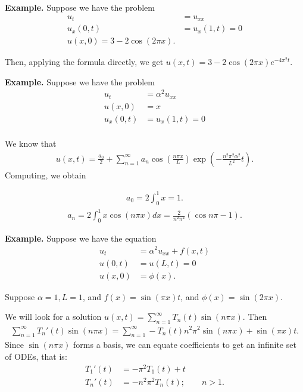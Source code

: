 \documentclass{article}
\begin{document}
{\bf Example.} Suppose we have the problem
\begin{align*}
  u_t &= u_{xx} \\
  u_x(0, t) &= u_x(1, t) = 0 \\
  u(x, 0) = 3 - 2 \cos (2 \pi x).
\end{align*}

Then, applying the formula directly, we get $u(x, t) = 3 - 2 \cos \left( 2 \pi x \right) e^{- 4 \pi^2 t}$.

{\bf Example.} Suppose we have the problem
\begin{align*}
  u_t &= \alpha^2 u_{xx} \\
  u(x, 0) &= x \\
  u_x(0, t) &= u_x(1, t) = 0 \\
\end{align*}

We know that
\begin{align*}
  u(x, t) = \frac{a_0}{2} + \sum_{n=1}^{\infty} a_n \cos \left( \frac{n \pi x}{L} \right) \exp \left( - \frac{n^2 \pi^2 \alpha^2}{L^2} t \right).
\end{align*}
Computing, we obtain

\begin{align*}
  a_0 = 2 \int_{0}^{1} x = 1.
\end{align*}
\begin{align*}
  a_n = 2 \int_{0}^{1} x \cos ( n \pi x) dx = \frac{2}{n^2 \pi^2} \left( \cos n \pi - 1 \right).
\end{align*}

{\bf Example.} Suppose we have the equation 
\begin{align*}
  u_t &= \alpha^2 u_{xx} + f(x, t) \\
  u(0, t) &= u(L, t) = 0 \\
  u(x, 0) &= \phi(x).
\end{align*}


Suppose $\alpha = 1, L = 1$, and $f(x) = \sin (\pi x) t$, and $\phi(x) = \sin(2 \pi x)$.

We will look for a solution $u(x, t) = \sum_{n=1}^{\infty} T_n(t) \sin (n \pi x)$.  Then
\begin{align*}
  \sum_{n=1}^{\infty} T_n'(t) \sin (n \pi x) = \sum_{n=1}^{\infty} - T_n(t) n^2 \pi^2 \sin(n \pi x) + \sin (\pi x) t.
\end{align*}
Since $\sin (n \pi x)$ forms a basis, we can equate coefficients to get an infinite set of ODEs, that is:
\begin{align*}
  T_1'(t) &= - \pi^2 T_1(t) + t \\
  T_n'(t) &= -n^2 \pi^2 T_n(t); \qquad n > 1.
\end{align*}
\end{document}
